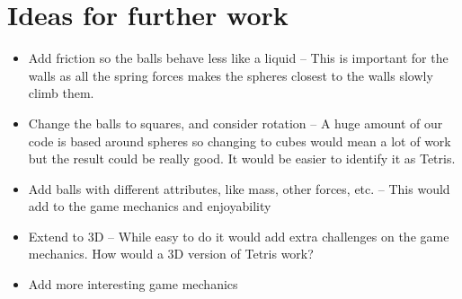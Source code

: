 \documentclass[11pt]{article} %
\begin{document}
\section{Ideas for further work}
\begin{itemize}
\item{Add friction so the balls behave less like a liquid -- This is important for the walls as all the spring forces makes the spheres closest to the walls slowly climb them.}
\item{Change the balls to squares, and consider rotation -- A huge amount of our code is based around spheres so changing to cubes would mean a lot of work but the result could be really good. It would be easier to identify it as Tetris.}
\item{Add balls with different attributes, like mass, other forces, etc. -- This would add to the game mechanics and enjoyability}
\item{Extend to 3D -- While easy to do it would add extra challenges on the game mechanics. How would a 3D version of Tetris work?}
\item{Add more interesting game mechanics}
\end{itemize}
\end{document}
